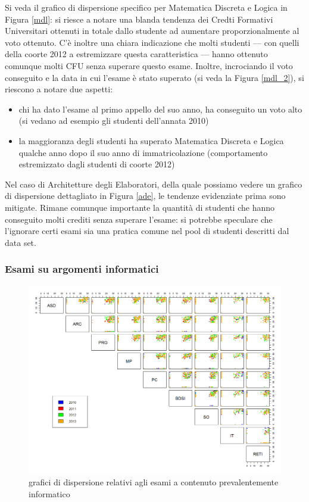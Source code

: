                 Si veda il grafico di dispersione specifico per Matematica Discreta e Logica in Figura \ref{mdl}: si riesce a notare una blanda tendenza dei Credti Formativi Universitari ottenuti in totale dallo studente ad aumentare proporzionalmente al voto ottenuto. C’è inoltre una chiara indicazione che molti studenti –-- con quelli della coorte 2012 a estremizzare questa caratteristica –-- hanno ottenuto comunque molti CFU senza superare questo esame. Inoltre, incrociando il voto conseguito e la data in cui l’esame è stato superato (si veda la Figura \ref{mdl_2}), si riescono a notare due aspetti:

                \begin{itemize}
                    \item chi ha dato l’esame al primo appello del suo anno, ha conseguito un voto alto (si vedano ad esempio gli studenti dell’annata 2010)
                    \item la maggioranza degli studenti ha superato Matematica Discreta e Logica qualche anno dopo il suo anno di immatricolazione (comportamento estremizzato dagli studenti di coorte 2012)
                \end{itemize}

                Nel caso di Architetture degli Elaboratori, della quale possiamo vedere un grafico di dispersione dettagliato in Figura \ref{ade}, le tendenze evidenziate prima sono mitigate. Rimane comunque importante la quantità di studenti che hanno conseguito molti crediti senza superare l’esame: si potrebbe speculare che l’ignorare certi esami sia una pratica comune nel pool di studenti descritti dal data set.

            \subsubsection{Esami su argomenti informatici}

                \begin{figure}
                    \centering
                    \caption{grafici di dispersione relativi agli esami a contenuto prevalentemente informatico}
                    \label{esami_inf}
                	\includegraphics[scale=0.32]{img/scatter_plot_7_gen.png}
                \end{figure}


